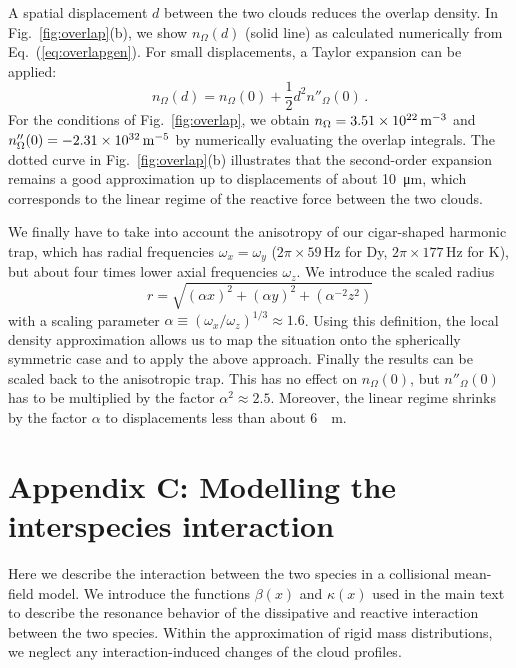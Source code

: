 A spatial displacement $d$ between the two clouds reduces the overlap density. In Fig.~\ref{fig:overlap}(b), we show $n_{\Omega}(d)$ (solid line) as calculated numerically from Eq.~(\ref{eq:overlapgen}).
For small displacements, a Taylor expansion can be applied:
\begin{equation}
	n_{\Omega}(d) = n_{\Omega}(0) + \frac{1}{2} d^2  n''_{\Omega}(0) \, .
	\label{eq:overlap2}
\end{equation}
For the conditions of Fig.~\ref{fig:overlap}, we obtain $n_{\Omega} = 3.51\times 10^{22}\,{\textrm m}^{-3}$ and $n''_{\Omega}(0) = -2.31 \times 10^{32}\,{\textrm m}^{-5}$ by numerically evaluating the overlap integrals.
The dotted curve in Fig.~\ref{fig:overlap}(b) illustrates that the second-order expansion remains a good approximation up to displacements of about \SI{10}{\micro m}, which corresponds to the linear regime of the reactive force between the two clouds.

We finally have to take into account the anisotropy of our cigar-shaped harmonic trap, which has radial frequencies $\omega_x = \omega_y$ ($2\pi \times 59$\,Hz for Dy, $2 \pi \times 177$\,Hz for K), but about four times lower axial frequencies $\omega_z$. We introduce the scaled radius
\begin{equation}
	r = \sqrt{(\alpha x)^2 + (\alpha y)^2 + (\alpha^{-2} z^2)} 
\end{equation}
with a scaling parameter $\alpha \equiv (\omega_x/\omega_z)^{1/3} \approx 1.6$. Using this definition, the local density approximation allows us to map the situation onto the spherically symmetric case and to apply the above approach. Finally the results can be scaled back to the anisotropic trap. This has no effect on $n_{\Omega}(0)$, but $n''_{\Omega}(0)$ has to be multiplied by the factor $\alpha^2 \approx 2.5$. Moreover, the linear regime shrinks by the factor $\alpha$ to displacements less than about \SI{6}{\mu m}.



\section{Appendix C: Modelling the interspecies interaction}
\label{app:cloudinteraction}

Here we describe the interaction between the two species in a collisional mean-field model. We introduce the functions $\beta(x)$ and $\kappa(x)$ used in the main text to describe the resonance behavior of the dissipative and reactive interaction between the two species. Within the approximation of rigid mass distributions, we neglect any interaction-induced changes of the cloud profiles.

